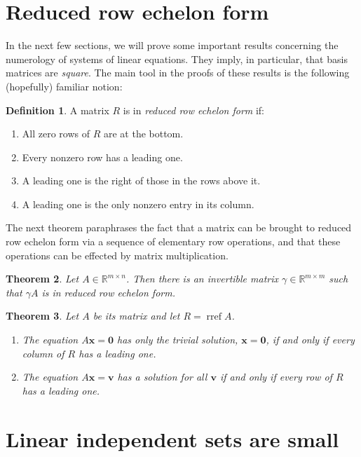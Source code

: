 \documentclass[12pt]{amsart}
\newcommand{\RR}{\mathbb{R}}
\DeclareMathOperator{\rref}{rref}
\newtheorem{theorem}{Theorem}[section]
\theoremstyle{definition}
\newtheorem{definition}[theorem]{Definition}
\newcommand{\bv}{\mathbf{v}}
\newcommand{\bx}{\mathbf{x}}
\newcommand{\bzero}{\mathbf{0}}
\begin{document}
\section{Reduced row echelon form}

In the next few sections, we will prove some important results concerning the numerology of systems of linear equations.
They imply, in particular, that basis matrices are \emph{square}.
The main tool in the proofs of these results is the following (hopefully) familiar notion:

\begin{definition}
	A matrix $R$ is in \emph{reduced row echelon form} if:
	\begin{enumerate}
		\item All zero rows of $R$ are at the bottom.
		\item Every nonzero row has a leading one.
		\item A leading one is the right of those in the rows above it.
		\item A leading one is the only nonzero entry in its column.
	\end{enumerate}
\end{definition}

The next theorem paraphrases the fact that a matrix can be brought to reduced row echelon form via a sequence of 
elementary row operations, and that these operations can be effected by matrix multiplication.
\begin{theorem}
	Let $A\in\RR^{m\times n}$. Then there is an invertible matrix $\gamma\in\RR^{m\times m}$
	such that $\gamma A$ is in reduced row echelon form.
\end{theorem}

\begin{theorem}
	Let $A$ be its matrix and let $R=\rref A$.
	\begin{enumerate}
		\item The equation $A\bx=\bzero$ has only the trivial solution, $\bx=\bzero$, if and only if every column
			of $R$ has a leading one.
		\item The equation $A\bx=\bv$ has a solution for all $\bv$ if and only if every row of $R$ has a leading one.

	\end{enumerate}
\end{theorem}

\section{Linear independent sets are small}
\end{document}
